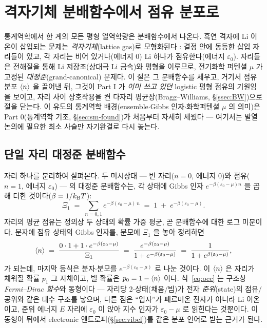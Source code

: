 \section{격자기체 분배함수에서 점유 분포로}\label{sec:partition}

통계역학에서 한 계의 모든 평형 열역학량은 분배함수에서 나온다. 흑연 격자에 Li 이온이 삽입되는 문제는
\emph{격자기체}(lattice gas)로 모형화된다 \cite{newman,huggins2009}: 결정 안에 동등한 삽입 자리들이 있고,
각 자리는 비어 있거나(에너지 $0$) Li 하나가 점유한다(에너지 $\varepsilon_0$). 자리들은 전해질을 통해 Li
저장조(상대극 Li 금속)와 평형을 이루므로, 전기화학 퍼텐셜 $\mu$ 가 고정된 \emph{대정준}(grand-canonical)
문제다. 이 절은 그 분배함수를 세우고, 거기서 점유 분포 $\langle n\rangle$ 을 끌어낸 뒤, 그것이 Part I 가 \emph{이미
쓰고 있던} logistic 평형 점유의 기원임을 보이고, 자리 사이 상호작용을 켠 다자리 평균장(Bragg--Williams,
\S\ref{ssec:BW})으로 절을 닫는다. 이 유도의 통계역학 배경(ensemble$\cdot$Gibbs 인자$\cdot$화학퍼텐셜 $\mu$ 의
의미)은 Part 0(통계역학 기초, \S\ref{sec:sm-found})가 처음부터 자세히 세웠다 --- 여기서는 발열 논의에 필요한 최소
사슬만 자기완결로 다시 놓는다.

\subsection{단일 자리 대정준 분배함수}\label{ssec:site}
자리 하나를 분리하여 살펴본다. 두 미시상태 --- 빈 자리($n=0$, 에너지 $0$)와 점유($n=1$, 에너지
$\varepsilon_0$) --- 의 대정준 분배함수는, 각 상태에 Gibbs 인자 $e^{-\beta(\varepsilon_0-\mu)n}$ 을 곱해 더한
것이다($\beta=1/k_{\mathrm B} T$):
\begin{equation}
\Xi_1 \;=\; \sum_{n=0,1} e^{-\beta(\varepsilon_0-\mu)\,n}
\;=\; 1 \;+\; e^{-\beta(\varepsilon_0-\mu)}.
\label{eq:Z1}
\end{equation}
자리의 평균 점유는 정의상 두 상태의 확률 가중 평균, 곧 분배함수에 대한 로그 미분이다. 분자에 점유 상태의
Gibbs 인자를, 분모에 $\Xi_1$ 을 놓아 정리하면
\begin{equation}
\langle n\rangle \;=\; \frac{0\cdot 1 + 1\cdot e^{-\beta(\varepsilon_0-\mu)}}{\Xi_1}
\;=\; \frac{e^{-\beta(\varepsilon_0-\mu)}}{1+e^{-\beta(\varepsilon_0-\mu)}}
\;=\; \frac{1}{1+e^{\beta(\varepsilon_0-\mu)}},
\label{eq:occ}
\end{equation}
가 되는데, 마지막 등식은 분자$\cdot$분모를 $e^{-\beta(\varepsilon_0-\mu)}$ 로 나눈 것이다. 이 $\langle n\rangle$ 은 자리가
채워질 확률 $p_1$ 그 자체이고, 빌 확률은 $p_0=1-\langle n\rangle$ 이다. 식~\eqref{eq:occ} 는 구조상 \emph{Fermi--Dirac
함수}와 동형이다 --- 자리당 2-상태(채움/빔)가 전자 \emph{준위}(state)의 점유/공위와 같은 대수 구조를 낳으며, 다른 점은
``입자''가 페르미온 전자가 아니라 Li 이온이고, 준위 에너지 $E$ 자리에 $\varepsilon_0$ 이 앉아 지수 인자가 $\varepsilon_0-\mu$ 로 읽힌다는 것뿐이다. 이 동형이
뒤에서 electronic 엔트로피(\S\ref{sec:vibel})를 같은 분포 언어로 받는 근거가 된다.

